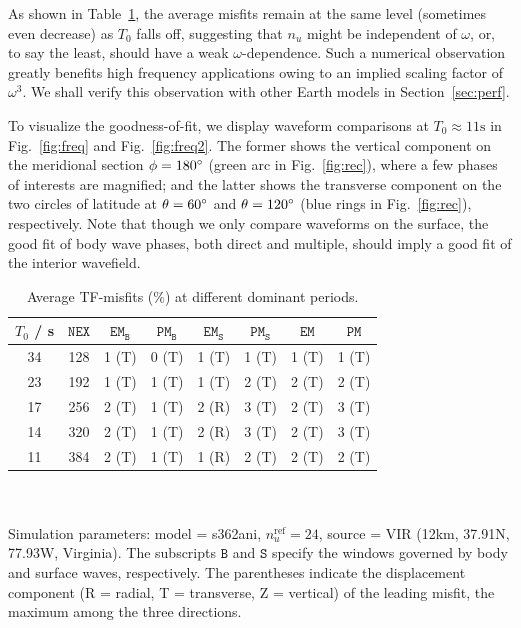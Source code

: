 \documentclass[extra]{gji}
\begin{document}
As shown in Table~\ref{tab:freq}, the average misfits remain at the same 
level (sometimes even decrease) as $T_0$ falls off, 
suggesting that $n_u$ might be independent of
$\omega$, or, to say the least, should have a weak $\omega$-dependence. 
Such a numerical observation greatly benefits high frequency applications
owing to an implied scaling factor of $\omega^3$. 
We shall verify this observation with other Earth models 
in Section~\ref{sec:perf}. 

To visualize the goodness-of-fit, we display waveform comparisons
at $T_0\approx11\text{s}$ in Fig.~\ref{fig:freq} and Fig.~\ref{fig:freq2}. 
The former shows the vertical component on the meridional section $\phi=180\hbox{$^\circ$}$
(green arc in Fig.~\ref{fig:rec}),
where a few phases of interests are magnified; 
and the latter shows the transverse component on the two 
circles of latitude at $\theta=60\hbox{$^\circ$}$ and $\theta=120\hbox{$^\circ$}$
(blue rings in Fig.~\ref{fig:rec}), respectively. 
Note that though we only compare waveforms on the surface,
the good fit of body wave phases, both direct and multiple, should imply 
a good fit of the interior wavefield. 

\begin{table}
\begin{minipage}{\columnwidth}
\caption{Average TF-misfits ($\%$) at different dominant periods.}
\label{tab:freq}
\setlength{\tabcolsep}{.28cm}
\begin{tabular*}{\textwidth}{cccccccc}
$T_0$ / s & $\mathtt{NEX}$ & $\mathtt{EM_B}$ & $\mathtt{PM_B}$ & 
$\mathtt{EM_S}$ & $\mathtt{PM_S}$ & $\mathtt{EM}$ & $\mathtt{PM}$\\[2pt]
\hline
34 & 128 &
1 {\scriptsize(T)}&
0 {\scriptsize(T)}&
1 {\scriptsize(T)}&
1 {\scriptsize(T)}&
1 {\scriptsize(T)}&
1 {\scriptsize(T)}\\[2pt]
23 & 192 &
1 {\scriptsize(T)}&
1 {\scriptsize(T)}&
1 {\scriptsize(T)}&
2 {\scriptsize(T)}&
2 {\scriptsize(T)}&
2 {\scriptsize(T)}\\[2pt]
17 & 256 &
2 {\scriptsize(T)}&
1 {\scriptsize(T)}&
2 {\scriptsize(R)}&
3 {\scriptsize(T)}&
2 {\scriptsize(T)}&
3 {\scriptsize(T)}\\[2pt]
14 & 320 &
2 {\scriptsize(T)}&
1 {\scriptsize(T)}&
2 {\scriptsize(R)}&
3 {\scriptsize(T)}&
2 {\scriptsize(T)}&
3 {\scriptsize(T)}\\[2pt]
11 & 384 & 
2 {\scriptsize(T)}&
1 {\scriptsize(T)}&
1 {\scriptsize(R)}&
2 {\scriptsize(T)}&
2 {\scriptsize(T)}&
2 {\scriptsize(T)}\\[2pt]
\hline
\end{tabular*}
\\\\
Simulation parameters: model = s362ani, $n_u^\text{ref}=24$, 
source = VIR (12km, 37.91\degr N, 77.93\degr W, Virginia).
The subscripts $\mathtt{B}$ and $\mathtt{S}$ specify the windows 
governed by body and surface waves, respectively.
The parentheses indicate the displacement component 
(R = radial, T = transverse, Z = vertical) of the leading misfit, 
the maximum among the three directions.
\end{minipage}
\end{table}
\end{document}
